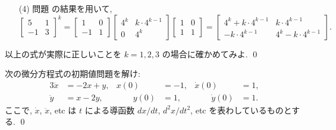 \documentclass[12pt,twoside]{jarticle}
\begin{document}
{\begin{enumerate}
\begin{equation*}
    = \begin{bmatrix} -1 & 1 \\ 1 & 0 \end{bmatrix}
      \begin{bmatrix} 2^k & k\cdot 2^{k-1} \\ 0 & 2^k \end{bmatrix}
      \begin{bmatrix} 0 & 1 \\ 1 & 1 \end{bmatrix}
    = \begin{bmatrix}
        2^k - k\cdot 2^{k-1} & -k\cdot 2^{k-1} \\
        k\cdot 2^{k-1}       & 2^k + k\cdot 2^{k-1}
      \end{bmatrix}.
  \end{equation*}
\item[(4)] 問題  の結果を用いて,
  \begin{equation*}
      \begin{bmatrix} 5 & 1 \\ -1 & 3 \end{bmatrix}^k
    = \begin{bmatrix} 1 & 0 \\ -1 & 1 \end{bmatrix}
      \begin{bmatrix} 4^k & k\cdot 4^{k-1} \\ 0 & 4^k \end{bmatrix}
      \begin{bmatrix} 1 & 0 \\ 1 & 1 \end{bmatrix}
    = \begin{bmatrix}
        4^k + k\cdot 4^{k-1} & k\cdot 4^{k-1} \\
        - k\cdot 4^{k-1}     & 4^k - k\cdot 4^{k-1}
      \end{bmatrix}.
  \end{equation*}
\end{enumerate}
以上の式が実際に正しいことを $k=1,2,3$ の場合に確かめてみよ.
\qed
}


\begin{question}
\label{q:shokichimondaiwotoke}
  次の微分方程式の初期値問題を解け:
  \begin{alignat*}{3}
    \ddot x & = - 2 x +   y, &
    x(0) & = - 1, &
    \dot x(0) & = 1, 
    \\
    \ddot y & =     x - 2 y, &
    \qquad y(0) & = 1, &
    \qquad \dot y(0) & = 1.
  \end{alignat*}
  ここで, $\dot x$, $\ddot x$, etc は $t$ による導函数 $dx/dt$,
  $d^2x/dt^2$, etc を表わしているものとする.  \qed
\end{question}
\end{document}
